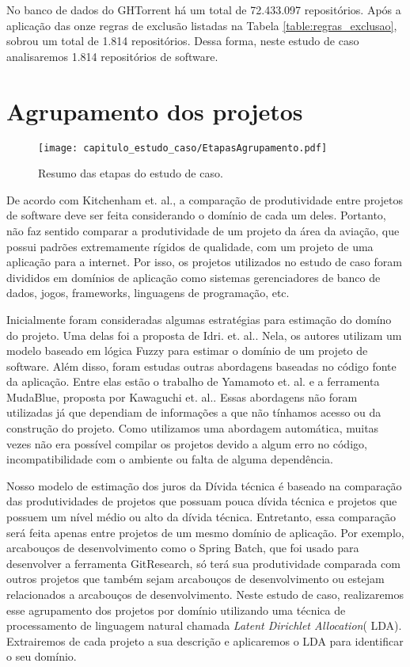 No banco de dados do GHTorrent há um total de 72.433.097 repositórios. Após a aplicação das onze regras de exclusão listadas na Tabela \ref{table:regras_exclusao}, sobrou um total de 1.814 repositórios.  Dessa forma, neste estudo de caso analisaremos 1.814 repositórios de software.

\section{Agrupamento dos projetos}

  \begin{figure}[H]
  \centering
  \texttt{[image: capitulo\_estudo\_caso/EtapasAgrupamento.pdf]} 
  \caption{Resumo das etapas do estudo de caso. }
  \label{fig:cap_metodo_resumo_etapas_agrupamento} 
\end{figure}


De acordo com Kitchenham et. al.\cite{kitchenham2004software}, a comparação de produtividade entre projetos de software deve ser feita considerando o domínio de cada um deles. Portanto, não faz sentido comparar a produtividade de um projeto da área da aviação, que possui padrões extremamente rígidos de qualidade, com um projeto de uma aplicação para a internet. Por isso, os projetos utilizados no estudo de caso foram divididos em domínios de aplicação como sistemas gerenciadores de banco de dados, jogos, frameworks, linguagens de programação, etc.

Inicialmente foram consideradas algumas estratégias para estimação do domíno do projeto. Uma delas foi a proposta de Idri. et. al.\cite{idri2001fuzzy}. Nela, os autores utilizam um modelo baseado em lógica Fuzzy para estimar o domínio de um projeto de software. Além disso, foram estudas outras abordagens baseadas no código fonte da aplicação. Entre elas estão o trabalho de Yamamoto et. al.\cite{yamamoto2005measuring} e a ferramenta MudaBlue, proposta por Kawaguchi et. al.\cite{kawaguchi2006mudablue}. Essas abordagens não foram utilizadas já que dependiam de informações a que não tínhamos acesso ou da construção do projeto. Como utilizamos uma abordagem automática, muitas vezes não era possível compilar os projetos devido a algum erro no código, incompatibilidade com o ambiente ou falta de alguma dependência. 

Nosso modelo de estimação dos juros da Dívida técnica é baseado na comparação das produtividades de projetos que possuam pouca dívida técnica e projetos que possuem um nível médio ou alto da dívida técnica. Entretanto, essa comparação será feita apenas entre projetos de um mesmo domínio de aplicação. Por exemplo, arcabouços de desenvolvimento como o Spring Batch\cite{cogoluegnes2011spring}, que foi usado para desenvolver a ferramenta GitResearch, só terá sua produtividade comparada com outros projetos que também sejam arcabouços de desenvolvimento ou estejam relacionados a arcabouços de desenvolvimento.  Neste estudo de caso, realizaremos esse agrupamento dos projetos por domínio utilizando uma técnica de processamento de linguagem natural chamada \textit{Latent Dirichlet Allocation}( LDA). Extrairemos de cada projeto a sua descrição e aplicaremos o LDA para identificar o seu domínio.

